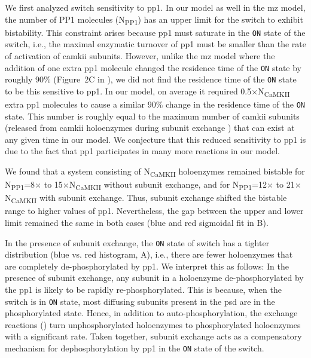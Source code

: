\documentclass[9pt,lineno,doublespacing]{elife}
\newcommand\SUB[2]{#1\textsubscript{#2}}
\begin{document}
We first analyzed switch sensitivity to \gls{pp1}. In our model as well in the
\gls{mz} model, the number of PP1 molecules (\SUB{N}{PP1}) has an upper limit
for the switch to exhibit bistability. This constraint arises because \gls{pp1}
must saturate in the \texttt{ON} state of the switch, i.e., the maximal
enzymatic turnover of \gls{pp1} must be smaller than the rate of activation of
\gls{camkii} subunits. However, unlike the \gls{mz} model where the addition of
one extra \gls{pp1} molecule changed the residence time of the \texttt{ON} state by
roughly 90\% (Figure~2C in \citep{miller_stability_2005}), we did not find the
residence time of the \texttt{ON} state to be this sensitive to \gls{pp1}. In our
model, on average it required 0.5$\times$\SUB{N}{CaMKII} extra \gls{pp1}
molecules to cause a similar 90\% change in the residence time of the \texttt{ON}
state.  This number is roughly equal to the maximum number of \gls{camkii}
subunits (released from \gls{camkii} holoenzymes during subunit exchange
) that can exist at any given time in our model. We conjecture
that this reduced sensitivity to \gls{pp1} is due to the fact that \gls{pp1}
participates in many more reactions in our model. 

We found that a system consisting of \SUB{N}{CaMKII} holoenzymes remained
bistable for \SUB{N}{PP1}=8$\times$ to 15$\times$\SUB{N}{CaMKII} without subunit
exchange, and for \SUB{N}{PP1}=12$\times$ to 21$\times$\SUB{N}{CaMKII} with
subunit exchange. Thus, subunit exchange shifted the bistable range to higher
values of \gls{pp1}. Nevertheless, the gap between the upper and lower limit remained
the same in both cases (blue and red sigmoidal fit in B).

In the presence of subunit exchange, the \texttt{ON} state of switch has a
tighter distribution (blue vs. red histogram, A), i.e., there
are fewer holoenzymes that are completely de-phosphorylated by \gls{pp1}. We
interpret this as follows: In the presence of subunit exchange, any subunit in a
holoenzyme de-phosphorylated by the \gls{pp1} is likely to be rapidly
re-phosphorylated. This is because, when the switch is in \texttt{ON} state,
most diffusing subunits present in the \gls{psd} are in the phosphorylated state. Hence,
in addition to auto-phosphorylation, the exchange reactions ()
turn unphosphorylated holoenzymes to phosphorylated holoenzymes with a
significant rate. Taken together, subunit exchange acts as a
compensatory mechanism for dephosphorylation by \gls{pp1} in the \texttt{ON}
state of the switch.
\end{document}
